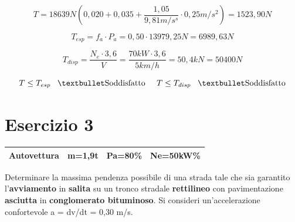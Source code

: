 \documentclass[
a4paper,
12pt, 
twoside]{scrbook}
\begin{document}
{{{    \begin{equation}
    	T=18639N(0,020+0,035+\frac{1,05}{9,81m/s^{s}}\cdot 0,25m/s^{2})=1523,90N
    \end{equation}
    \leavevmode\newline
    {
    	\centering
    	
    	\begin{equation}
    		T_{esp}=f_{a}\cdot P_{a}= 0,50\cdot 13979,25N= 6989,63N
    	\end{equation}
    	
    	\begin{equation}
    		T_{disp}=\frac{N_e\cdot 3,6}{V}=\frac{70kW\cdot 3,6}{5km/h}=50,4kN=50400N
    	\end{equation}
    
    \begin{equation}
    	T\leq T_{esp}\phantom{...}\textbullet\textnormal{Soddisfatto}\phantom{.....} T\leq T_{disp}\phantom{...}\textbullet\textnormal{Soddisfatto}
    \end{equation}
    
    \section{Esercizio 3}
    \leavevmode\newline
    {
    	\centering
    	\begin{tabular}{|c|c|c|c|}
    		\hline
    		\rule[-1ex]{0pt}{2.5ex}  Autovettura & m=1,9t & Pa=80\% & Ne=50kW\% \\
    		\hline
    	\end{tabular}\par
    }
    
    \leavevmode\newline
    
    \begin{boxK}
    	Determinare la massima pendenza possibile di una strada tale che sia garantito l’\textbf{avviamento} in \textbf{salita} su un tronco stradale \textbf{rettilineo} con pavimentazione \textbf{asciutta} in \textbf{conglomerato bituminoso}. Si consideri un’accelerazione confortevole a = dv/dt = 0,30 m/s\texttwosuperior.
    \end{boxK}
     
}}}}
\end{document}
